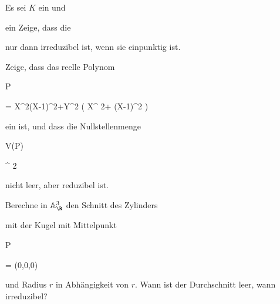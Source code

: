 {} {}




{}


{


Es sei $K$ ein
und


 ein
Zeige, dass die


 nur dann irreduzibel ist, wenn sie einpunktig ist.


}


{} {}




{}


{


Zeige, dass das reelle Polynom


\mavergleichskettedisp


{\vergleichskette


{ P
}


{ =} { X^2(X-1)^2+Y^2 \left(  X^ 2+ (X-1)^2  \right)
}


{ \in} { \R[X,Y]
}


{ } {
}


{ } {
}


}
{}{}{}
ein
ist, und dass die Nullstellenmenge


\mavergleichskettedisp


{\vergleichskette


{ V(P)
}


{ \subseteq} { \R^ 2
}


{ } {
}


{ } {
}


{ } {
}


}
{}{}{}
nicht leer, aber reduzibel ist.


}


{} {}




{}


{


Berechne in ${ {\mathbb A}_{  \R  }^{  3   } }$ den Schnitt des Zylinders


 mit der Kugel mit Mittelpunkt


\mavergleichskette


{\vergleichskette


{ P
}


{ = }{ (0,0,0)
}


{  }{
}


{    }{
}


{   }{
}


}
{}{}{}
und Radius $r$ in Abhängigkeit von $r$. Wann ist der Durchschnitt leer, wann irreduzibel?


}


